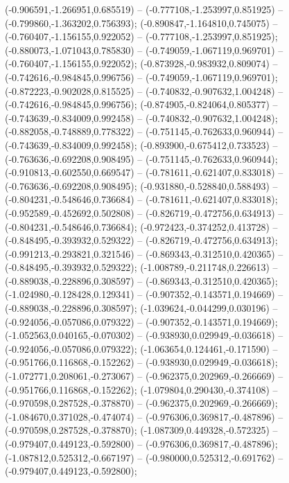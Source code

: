  (-0.906591,-1.266951,0.685519) -- (-0.777108,-1.253997,0.851925) -- (-0.799860,-1.363202,0.756393);
 (-0.890847,-1.164810,0.745075) -- (-0.760407,-1.156155,0.922052) -- (-0.777108,-1.253997,0.851925);
 (-0.880073,-1.071043,0.785830) -- (-0.749059,-1.067119,0.969701) -- (-0.760407,-1.156155,0.922052);
 (-0.873928,-0.983932,0.809074) -- (-0.742616,-0.984845,0.996756) -- (-0.749059,-1.067119,0.969701);
 (-0.872223,-0.902028,0.815525) -- (-0.740832,-0.907632,1.004248) -- (-0.742616,-0.984845,0.996756);
 (-0.874905,-0.824064,0.805377) -- (-0.743639,-0.834009,0.992458) -- (-0.740832,-0.907632,1.004248);
 (-0.882058,-0.748889,0.778322) -- (-0.751145,-0.762633,0.960944) -- (-0.743639,-0.834009,0.992458);
 (-0.893900,-0.675412,0.733523) -- (-0.763636,-0.692208,0.908495) -- (-0.751145,-0.762633,0.960944);
 (-0.910813,-0.602550,0.669547) -- (-0.781611,-0.621407,0.833018) -- (-0.763636,-0.692208,0.908495);
 (-0.931880,-0.528840,0.588493) -- (-0.804231,-0.548646,0.736684) -- (-0.781611,-0.621407,0.833018);
 (-0.952589,-0.452692,0.502808) -- (-0.826719,-0.472756,0.634913) -- (-0.804231,-0.548646,0.736684);
 (-0.972423,-0.374252,0.413728) -- (-0.848495,-0.393932,0.529322) -- (-0.826719,-0.472756,0.634913);
 (-0.991213,-0.293821,0.321546) -- (-0.869343,-0.312510,0.420365) -- (-0.848495,-0.393932,0.529322);
 (-1.008789,-0.211748,0.226613) -- (-0.889038,-0.228896,0.308597) -- (-0.869343,-0.312510,0.420365);
 (-1.024980,-0.128428,0.129341) -- (-0.907352,-0.143571,0.194669) -- (-0.889038,-0.228896,0.308597);
 (-1.039624,-0.044299,0.030196) -- (-0.924056,-0.057086,0.079322) -- (-0.907352,-0.143571,0.194669);
 (-1.052563,0.040165,-0.070302) -- (-0.938930,0.029949,-0.036618) -- (-0.924056,-0.057086,0.079322);
 (-1.063654,0.124461,-0.171590) -- (-0.951766,0.116868,-0.152262) -- (-0.938930,0.029949,-0.036618);
 (-1.072771,0.208061,-0.273067) -- (-0.962375,0.202969,-0.266669) -- (-0.951766,0.116868,-0.152262);
 (-1.079804,0.290430,-0.374108) -- (-0.970598,0.287528,-0.378870) -- (-0.962375,0.202969,-0.266669);
 (-1.084670,0.371028,-0.474074) -- (-0.976306,0.369817,-0.487896) -- (-0.970598,0.287528,-0.378870);
 (-1.087309,0.449328,-0.572325) -- (-0.979407,0.449123,-0.592800) -- (-0.976306,0.369817,-0.487896);
 (-1.087812,0.525312,-0.667197) -- (-0.980000,0.525312,-0.691762) -- (-0.979407,0.449123,-0.592800);
